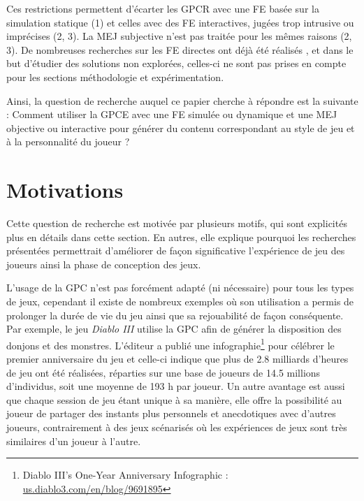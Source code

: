 \documentclass[a4paper,11pt]{article}
\begin{document}
      Ces restrictions permettent d'écarter les GPCR avec une FE basée sur la simulation statique (1) et celles avec des FE interactives, jugées trop intrusive ou imprécises (2, 3).
      La MEJ subjective n'est pas traitée pour les mêmes raisons (2, 3).
      De nombreuses recherches sur les FE directes ont déjà été réalisés \cite{Agius}, et dans le but d'étudier des solutions non explorées, celles-ci ne sont pas prises en compte pour les sections méthodologie et expérimentation.

      Ainsi, la question de recherche auquel ce papier cherche à répondre est la suivante : 
      Comment utiliser la GPCE avec une FE simulée ou dynamique et une MEJ objective ou interactive pour générer du contenu correspondant au style de jeu et à la personnalité du joueur ?
      

    \section{Motivations}\label{section:motivations}
    
      Cette question de recherche est motivée par plusieurs motifs, qui sont explicités plus en détails dans cette section.
      En autres, elle explique pourquoi les recherches présentées permettrait d'améliorer de façon significative l'expérience de jeu des joueurs ainsi la phase de conception des jeux. 

      L'usage de la GPC n'est pas forcément adapté (ni nécessaire) pour tous les types de jeux, cependant il existe de nombreux exemples où son utilisation a permis de prolonger la durée de vie du jeu ainsi que sa rejouabilité de façon conséquente.
      Par exemple, le jeu \textit{Diablo III} \cite{game:DiabloIII} utilise la GPC afin de générer la disposition des donjons et des monstres. 
      L'éditeur a publié une infographie\footnote{Diablo III’s One-Year Anniversary Infographic : \url{us.diablo3.com/en/blog/9691895}} pour célébrer le premier anniversaire du jeu et celle-ci indique que plus de 2.8 milliards d'heures de jeu ont été réalisées, réparties sur une base de joueurs de 14.5 millions d'individus, soit une moyenne de 193 h par joueur.
      Un autre avantage est aussi que chaque session de jeu étant unique à sa manière, elle offre la possibilité au joueur de partager des instants plus personnels et anecdotiques avec d'autres joueurs, contrairement à des jeux scénarisés où les expériences de jeux sont très similaires d'un joueur à l'autre.
\end{document}
